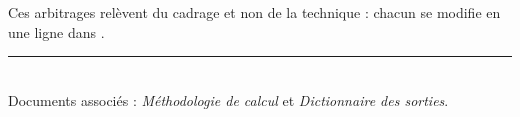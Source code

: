 \documentclass[11pt,a4paper]{article}
\begin{document}
Ces arbitrages relèvent du cadrage et non de la technique : chacun se modifie en une ligne dans
.

\vfill
\noindent\rule{\linewidth}{0.4pt}\\[2pt]
\small
Documents associés : \emph{Méthodologie de calcul} et \emph{Dictionnaire des sorties}.
\end{document}
